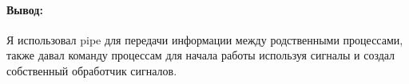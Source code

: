 \paragraph{Вывод:}
Я использовал pipe для передачи информации между родственными процессами,
также давал команду процессам для начала работы используя сигналы и создал собственный обработчик сигналов.
